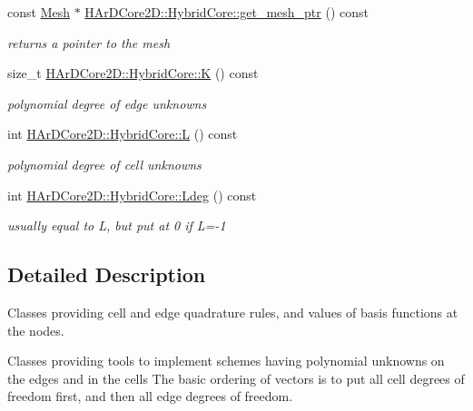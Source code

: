 \begin{DoxyCompactItemize}
\mbox{\label{group__HybridCore_gab3337e9e6d16154e080e247b3fa43d72}} 
const \hyperlink{classHArDCore2D_1_1Mesh}{Mesh} $\ast$ \hyperlink{group__HybridCore_gab3337e9e6d16154e080e247b3fa43d72}{H\+Ar\+D\+Core2\+D\+::\+Hybrid\+Core\+::get\+\_\+mesh\+\_\+ptr} () const
\begin{DoxyCompactList}\small\item\em returns a pointer to the mesh \end{DoxyCompactList}\item 
\mbox{\label{group__HybridCore_gadaf859b98dea34338c9e6376e975b131}} 
size\+\_\+t \hyperlink{group__HybridCore_gadaf859b98dea34338c9e6376e975b131}{H\+Ar\+D\+Core2\+D\+::\+Hybrid\+Core\+::K} () const
\begin{DoxyCompactList}\small\item\em polynomial degree of edge unknowns \end{DoxyCompactList}\item 
\mbox{\label{group__HybridCore_ga816cd87658b200d1ea32d2c4fefd5c6e}} 
int \hyperlink{group__HybridCore_ga816cd87658b200d1ea32d2c4fefd5c6e}{H\+Ar\+D\+Core2\+D\+::\+Hybrid\+Core\+::L} () const
\begin{DoxyCompactList}\small\item\em polynomial degree of cell unknowns \end{DoxyCompactList}\item 
\mbox{\label{group__HybridCore_gaaa9fe846646c9e26f699364ac29631f6}} 
int \hyperlink{group__HybridCore_gaaa9fe846646c9e26f699364ac29631f6}{H\+Ar\+D\+Core2\+D\+::\+Hybrid\+Core\+::\+Ldeg} () const
\begin{DoxyCompactList}\small\item\em usually equal to L, but put at 0 if L=-\/1 \end{DoxyCompactList}\end{DoxyCompactItemize}


\subsection{Detailed Description}
Classes providing cell and edge quadrature rules, and values of basis functions at the nodes. 

Classes providing tools to implement schemes having polynomial unknowns on the edges and in the cells The basic ordering of vectors is to put all cell degrees of freedom first, and then all edge degrees of freedom.

